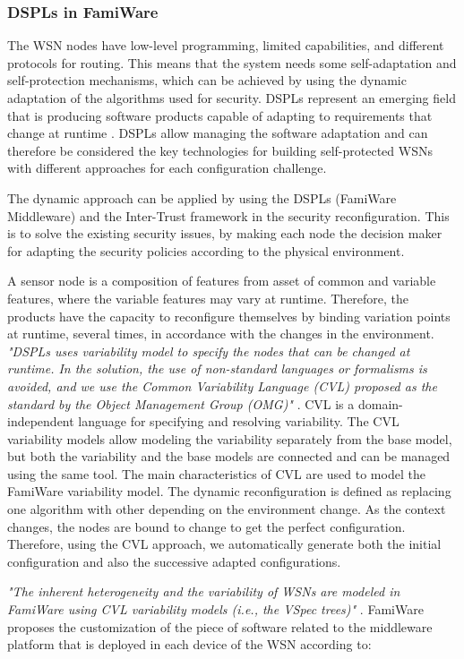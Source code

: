 \documentclass[12pt,a4paper,twoside]{report}
\begin{document}
\subsubsection{DSPLs in FamiWare}
The WSN nodes have low-level programming, limited capabilities, and different protocols for routing. This means that the system needs some self-adaptation and self-protection mechanisms, which can be achieved by using the dynamic adaptation of the algorithms used for security. DSPLs represent an emerging field that is producing software products capable of adapting to requirements that change at runtime \cite{Pinto;etal:2013}. DSPLs allow managing the software adaptation and can therefore be considered the key technologies for building self-protected WSNs with different approaches for each configuration challenge.\par
The dynamic approach can be applied by using the DSPLs (FamiWare Middleware) and the Inter-Trust framework in the security reconfiguration. This is to solve the existing security issues, by making each node the decision maker for adapting the security policies according to the physical environment.\par
A sensor node is a composition of features from asset of common and variable features, where the variable features may vary at runtime. Therefore, the products have the capacity to reconfigure themselves by binding variation points at runtime, several times, in accordance with the changes in the environment. \emph{"DSPLs uses variability model to specify the nodes that can be changed at runtime. In the solution, the use of non-standard languages or formalisms is avoided, and we use the Common Variability Language (CVL) proposed as the standard by the Object Management Group (OMG)"} \cite{Pinto;etal:2013}. CVL is a domain-independent language for specifying and resolving variability. The CVL variability models allow modeling the variability separately from the base model, but both the variability and the base models are connected and can be managed using the same tool. The main characteristics of CVL are used to model the FamiWare variability model. The dynamic reconfiguration is defined as replacing one algorithm with other depending on the environment change. As the context changes, the nodes are bound to change to get the perfect configuration. Therefore, using the CVL approach, we automatically generate both the initial configuration and also the successive adapted configurations. \par
\emph{"The inherent heterogeneity and the variability of WSNs are modeled in FamiWare using CVL variability models (i.e., the VSpec trees)"} \cite{Pinto;etal:2013}. FamiWare proposes the customization of the piece of software related to the middleware platform that is deployed in each device of the WSN according to: \par
\end{document}
